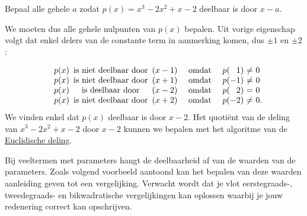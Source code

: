 \documentclass{ximera}
\begin{document}
\begin{example} 
	Bepaal alle gehele \(a\) zodat  \(p(x) =x^3-2x^2+x-2\) deelbaar is door \(x-a\).
		
	We moeten dus alle gehele nulpunten van \(p(x)\) bepalen. Uit vorige eigenschap volgt dat enkel delers van de constante term in aanmerking komen, dus \(\pm1\) en \(\pm2\):
		
	\renewcommand{\bullet}{}   %
	\[
	\begin{array}{lr@{\,}c@{\,}lcl@{}c@{}r@{}c@{\ }c@{\ }l}
	\bullet&p(x)&\textrm{ is niet deelbaar door }  &(x-1)&\textrm{ omdat }&p&(& 1&)&\neq   &0\\
	\bullet&p(x)&\textrm{ is niet deelbaar door }  &(x+1)&\textrm{ omdat }&p&(&-1&)&\neq   &0\\
	\bullet&p(x)&\textrm{ is deelbaar door }    &(x-2)&\textrm{ omdat }&p&(& 2&)&=   &0\\
	\bullet&p(x)&\textrm{ is niet deelbaar door }    &(x+2)&\textrm{ omdat }&p&(&-2&)&\neq   &0.
	\end{array}
	\]
	We vinden enkel dat \(p(x)\) deelbaar is door \(x-2\). Het quotiënt van de deling van \(x^3-2x^2+x-2\) door \(x-2\) kunnen we bepalen met het algoritme van de \hyperref[euclidische deling: algoritme]{Euclidische deling}.
\end{example}







Bij veeltermen met parameters hangt de deelbaarheid af van de waarden van de parameters. Zoals volgend voorbeeld aantoond kan het bepalen van deze waarden aanleiding geven tot een vergelijking. Verwacht wordt dat je vlot eerstegraads-, tweedegraads- en bikwadratische vergelijkingen kan oplossen waarbij je jouw redenering correct kan opschrijven. 
\end{document}
